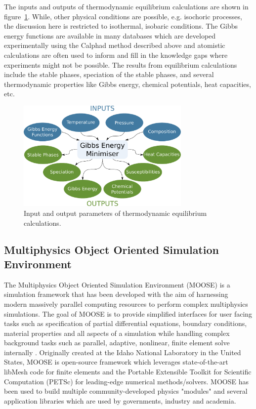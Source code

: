 	The inputs and outputs of thermodynamic equilibrium calculations are shown in figure~\ref{fig:Thermod}. While, other physical conditions are possible, e.g. isochoric processes, the discussion here is restricted to isothermal, isobaric conditions. The Gibbs energy functions are available in many databases which are developed experimentally using the Calphad method described above and atomistic calculations are often used to inform and fill in the knowledge gaps where experiments might not be possible. The results from equilibrium calculations include the stable phases, speciation of the stable phases, and several thermodynamic properties like Gibbs energy, chemical potentials, heat capacities, etc.
	\begin{figure}[ht]
        		\centering
        		\includegraphics[width=0.75\textwidth]{figures/chapter-1/thermodynamics.pdf}
        		\caption{Input and output parameters of thermodynamic equilibrium calculations.}
        		\label{fig:Thermod}
    	\end{figure}
	
\subsection{Multiphysics Object Oriented Simulation Environment}
	The Multiphysics Object Oriented Simulation Environment (MOOSE) is a simulation framework that has been developed with the aim of harnessing modern massively parallel computing resources to perform complex multiphysics simulations. The goal of MOOSE is to provide simplified interfaces for user facing tasks such as specification of partial differential equations, boundary conditions, material properties and all aspects of a simulation while handling complex background tasks such as parallel, adaptive, nonlinear, finite element solve internally \cite{Permann:2020aa}. Originally created at the Idaho National Laboratory in the United States, MOOSE is open-source framework which leverages state-of-the-art libMesh code \cite{Kirk:2006aa} for finite elements and the Portable Extensible Toolkit for Scientific Computation (PETSc) \cite{Balay:2022ab,Balay:2022aa} for leading-edge numerical methods/solvers. MOOSE has been used to build multiple community-developed physics "modules" \cite{Guillaume:2021aa,Guillaume:2021ab,Adhikary:2016aa,Wilkins:2020aa,Shemon:2021aa} and several application libraries which are used by governments, industry and academia. 
	
